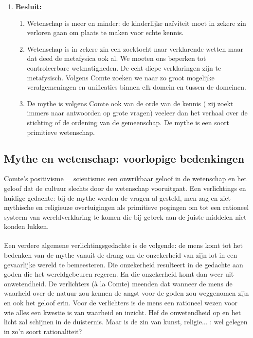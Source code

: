 \begin{enumerate}
\item[] \underline{\textbf{Besluit:}}
\begin{enumerate}
\item Wetenschap is meer en minder: de kinderlijke naïviteit moet in zekere zin verloren gaan om plaats te maken voor echte kennis.
\item Wetenschap is in zekere zin een zoektocht naar verklarende wetten maar dat deed de metafysica ook al. We moeten ons beperken tot controleerbare wetmatigheden. De echt diepe verklaringen zijn te metafysisch.
Volgens Comte zoeken we naar zo groot mogelijke veralgemeningen en unificaties binnen elk domein en tussen de domeinen.
\item De mythe is volgens Comte ook van de orde van de kennis ( zij zoekt immers naar antwoorden op grote vragen) veeleer dan het verhaal over de stichting of de ordening van de gemeenschap. De mythe is een soort primitieve wetenschap.
\end{enumerate}
\end{enumerate}
\subsection{Mythe en wetenschap: voorlopige bedenkingen}
Comte's positivisme = sci\"entisme: een onwrikbaar geloof in de wetenschap en het geloof dat de cultuur slechts door de wetenschap vooruitgaat. Een verlichtings en huidige gedachte: bij de mythe werden de vragen al gesteld, men zag en ziet mythische en religieuze overtuigingen als primitieve pogingen om tot een rationeel systeem van wereldverklaring te komen die bij gebrek aan de juiste middelen niet konden lukken.
\\ \\
Een verdere algemene verlichtingsgedachte is de volgende: de mens komt tot het bedenken van de mythe vanuit de drang om de onzekerheid van zijn lot in een gevaarlijke wereld te bemeesteren. Die onzekerheid resulteert in de gedachte aan goden die het wereldgebeuren regeren. En die onzekerheid komt dan weer uit onwetendheid. De verlichters (\`a la Comte) meenden dat wanneer de mens de waarheid over de natuur zou kennen de angst voor de goden zou weggenomen zijn en ook het geloof erin. Voor de verlichters is de mens een rationeel wezen voor wie alles een kwestie is van waarheid en inzicht. Hef de onwetendheid op en het licht zal schijnen in de duisternis.
Maar is de zin van kunst, religie... : wel gelegen in zo'n soort rationaliteit?
